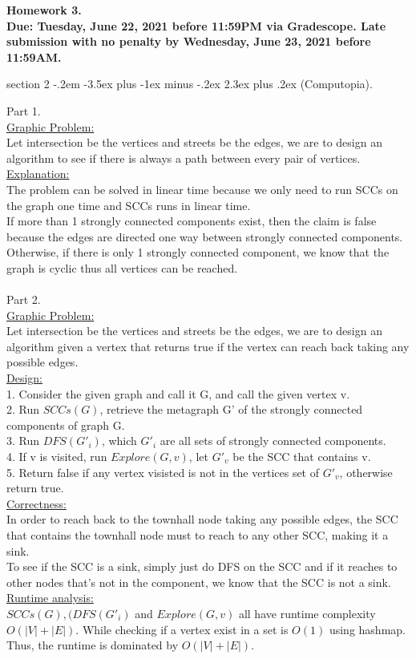 \documentclass{article}
\makeatletter
\newenvironment{problem}{\@startsection
       {section}
       {2}
       {-.2em}
       {-3.5ex plus -1ex minus -.2ex}
       {2.3ex plus .2ex}
       {\pagebreak[3]%
       \large\bf\noindent{Problem }
       }
       }
\makeatother
\begin{document}
{\bf \noindent Homework 3. \\ Due: Tuesday, June 22, 2021 before 11:59PM via Gradescope. Late submission with no penalty by Wednesday, June 23, 2021 before 11:59AM.}

\begin{problem}{(Computopia).}
 
Part 1.\\
\underline{Graphic Problem:}\\
Let intersection be the vertices and streets be the edges, we are to design an algorithm to see if there is always a path between every pair of vertices.\\
\underline{Explanation:}\\
The problem can be solved in linear time because we only need to run SCCs on the graph one time and SCCs runs in linear time.\\
If more than 1 strongly connected components exist, then the claim is false because the edges are directed one way between strongly connected components.\\
Otherwise, if there is only 1 strongly connected component, we know that the graph is cyclic thus all vertices can be reached.
\\ \hspace*{\fill} \\
Part 2.\\
\underline{Graphic Problem:}\\
Let intersection be the vertices and streets be the edges, we are to design an algorithm given a vertex that returns true if the vertex can reach back taking any possible edges.\\
\underline{Design:}\\
1. Consider the given graph and call it G, and call the given vertex v.\\
2. Run \(SCCs(G)\), retrieve the metagraph G' of the strongly connected components of graph G.\\
3. Run \(DFS(G'_i)\), which \(G'_i\) are all sets of strongly connected components.\\
4. If v is visited, run \(Explore(G, v)\), let \(G'_v\) be the SCC that contains v.\\
5. Return false if any vertex visisted is not in the vertices set of \(G'_v\), otherwise return true.\\
\underline{Correctness:}\\
In order to reach back to the townhall node taking any possible edges, the SCC that contains the townhall node must to reach to any other SCC, making it a sink.\\
To see if the SCC is a sink, simply just do DFS on the SCC and if it reaches to other nodes that's not in the component, we know that the SCC is not a sink.\\
\underline{Runtime analysis:}\\
\(SCCs(G), (DFS(G'_i)\) and \(Explore(G, v)\) all have runtime complexity \(O(|V|+|E|)\). While checking if a vertex exist in a set is \(O(1)\) using hashmap.\\
Thus, the runtime is dominated by \(O(|V|+|E|)\).




\end{problem}
\end{document}
